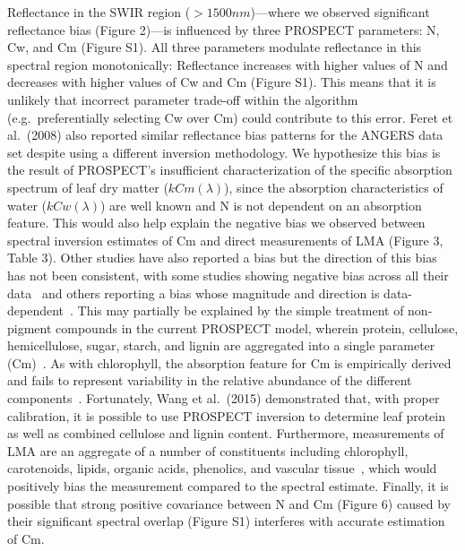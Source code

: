 Reflectance in the SWIR region ($>1500 nm$)---where we observed significant reflectance bias (Figure 2)---is influenced by three PROSPECT parameters: N, Cw, and Cm (Figure S1). %
All three parameters modulate reflectance in this spectral region monotonically: 
Reflectance increases with higher values of N and decreases with higher values of Cw and Cm (Figure S1). %
This means that it is unlikely that incorrect parameter trade-off within the algorithm (e.g.\ preferentially selecting Cw over Cm) could contribute to this error.
Feret et al.~(2008) also reported similar reflectance bias patterns for the ANGERS data set despite using a different inversion methodology. \nocite{feret_2008_prospect}
We hypothesize this bias is the result of PROSPECT’s insufficient characterization of the specific absorption spectrum of leaf dry matter ($kCm(\lambda)$),
since the absorption characteristics of water ($kCw(\lambda)$) are well known and N is not dependent on an absorption feature.
This would also help explain the negative bias we observed between spectral inversion estimates of Cm and direct measurements of LMA (Figure 3, Table 3). %
Other studies have also reported a bias but the direction of this bias has not been consistent, with some studies showing negative bias across all their data~\cite{li_2011_retrieval,cheng_2014_deriving} and others reporting a bias whose magnitude and direction is data-dependent~\cite{feret_2008_prospect}.
This may partially be explained by the simple treatment of non-pigment compounds in the current PROSPECT model, wherein protein, cellulose, hemicellulose, sugar, starch, and lignin are aggregated into a single parameter (Cm)~\cite{fourty_1996_leaf}.
As with chlorophyll, the absorption feature for Cm is empirically derived~\cite{feret_2008_prospect} and fails to represent variability in the relative abundance of the different components~\cite{poorter_2009_causes}.
Fortunately, Wang et al.~(2015) demonstrated that, with proper calibration, it is possible to use PROSPECT inversion to determine leaf protein as well as combined cellulose and lignin content. \nocite{wang_2015_applicability}
Furthermore, measurements of LMA are an aggregate of a number of constituents including chlorophyll, carotenoids, lipids, organic acids, phenolics, and vascular tissue~\cite{poorter_2009_causes}, which would positively bias the measurement compared to the spectral estimate.
Finally, it is possible that strong positive covariance between N and Cm (Figure 6) caused by their significant spectral overlap (Figure S1) interferes with accurate estimation of Cm. %
